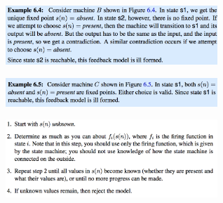 \documentclass[10pt,landscape]{article}
\begin{document}
\begin{multicols}{3}
\begin{center}
\includegraphics*[width = 8cm]{Fig16.png}\\
\end{center}

\begin{center}
\includegraphics*[width = 8cm]{Fig17.png}\\
\end{center}

\begin{center}
\includegraphics*[width = 8cm]{Fig18.png}\\
\end{center}





\end{multicols}
\end{document}
